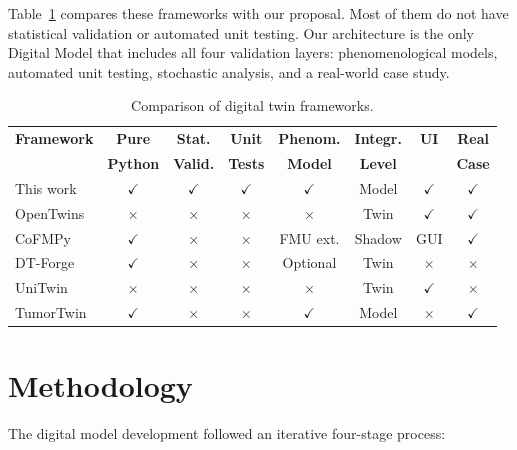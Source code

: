 \documentclass[10pt]{article}
\begin{document}
Table~\ref{tab:comparativa} compares these frameworks with our proposal. Most of them do not have statistical validation or automated unit testing. Our architecture is the only Digital Model that includes all four validation layers: phenomenological models, automated unit testing, stochastic analysis, and a real-world case study.

\begin{table}[!ht]
\centering
\caption{Comparison of digital twin frameworks.}
\label{tab:comparativa}
\small
\begin{tabular}{lccccccc}
\toprule
\textbf{Framework} & \textbf{Pure} & \textbf{Stat.} & \textbf{Unit} & \textbf{Phenom.} & \textbf{Integr.} & \textbf{UI} & \textbf{Real} \\
 & \textbf{Python} & \textbf{Valid.} & \textbf{Tests} & \textbf{Model} & \textbf{Level} & & \textbf{Case} \\
\midrule
This work & $\checkmark$ & $\checkmark$ & $\checkmark$ & $\checkmark$ & Model & $\checkmark$ & $\checkmark$ \\
OpenTwins & $\times$ & $\times$ & $\times$ & $\times$ & Twin & $\checkmark$ & $\checkmark$ \\
CoFMPy & $\checkmark$ & $\times$ & $\times$ & FMU ext. & Shadow & GUI & $\checkmark$ \\
DT-Forge & $\checkmark$ & $\times$ & $\times$ & Optional & Twin & $\times$ & $\times$ \\
UniTwin & $\times$ & $\times$ & $\times$ & $\times$ & Twin & $\checkmark$ & $\times$ \\
TumorTwin & $\checkmark$ & $\times$ & $\times$ & $\checkmark$ & Model & $\times$ & $\checkmark$ \\
\bottomrule
\end{tabular}
\end{table}

\section{Methodology}

The digital model development followed an iterative four-stage process:
\end{document}
